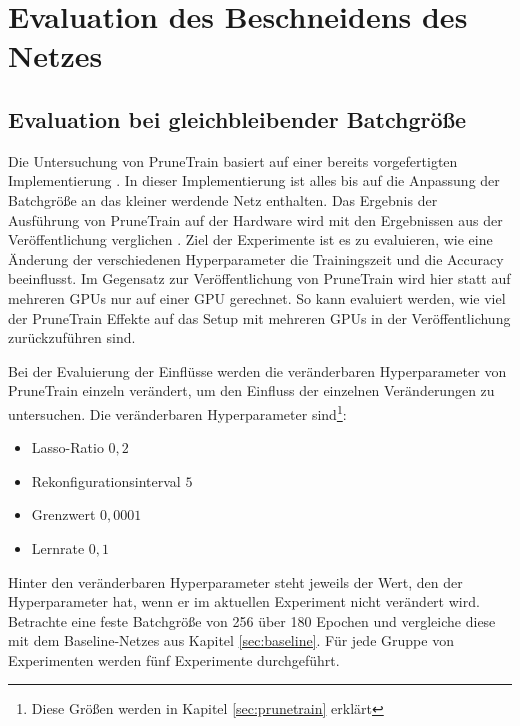 
\chapter{Evaluation des Beschneidens des Netzes}\label{sec:ptexperimente}
\section{Evaluation bei gleichbleibender Batchgröße}

Die Untersuchung von PruneTrain basiert auf einer bereits vorgefertigten Implementierung \cite{ptImpl}. In dieser Implementierung ist alles bis auf die Anpassung der Batchgröße an das kleiner werdende Netz enthalten. Das Ergebnis der Ausführung von PruneTrain auf der Hardware wird mit den Ergebnissen aus der Veröffentlichung verglichen \cite{prunetrain}. Ziel der Experimente ist es zu evaluieren, wie eine Änderung der verschiedenen Hyperparameter die Trainingszeit und die Accuracy beeinflusst. Im Gegensatz zur Veröffentlichung von PruneTrain wird hier statt auf mehreren GPUs nur auf einer GPU gerechnet. So kann evaluiert werden, wie viel der PruneTrain Effekte auf das Setup mit mehreren GPUs in der Veröffentlichung zurückzuführen sind. 

Bei der Evaluierung der Einflüsse werden die veränderbaren Hyperparameter von PruneTrain einzeln verändert, um den Einfluss der einzelnen Veränderungen zu untersuchen.  
Die veränderbaren Hyperparameter sind\footnote{Diese Größen werden in Kapitel \ref{sec:prunetrain} erklärt}:
\begin{itemize}
 \item Lasso-Ratio $0,2$
 \item Rekonfigurationsinterval $5$
 \item Grenzwert $0,0001$
 \item Lernrate $0,1$
\end{itemize}
Hinter den veränderbaren Hyperparameter steht jeweils der Wert, den der Hyperparameter hat, wenn er im aktuellen Experiment nicht verändert wird.
Betrachte eine feste Batchgröße von 256 über 180 Epochen und vergleiche diese mit dem Baseline-Netzes aus Kapitel \ref{sec:baseline}. Für jede Gruppe von Experimenten werden fünf Experimente durchgeführt. 


